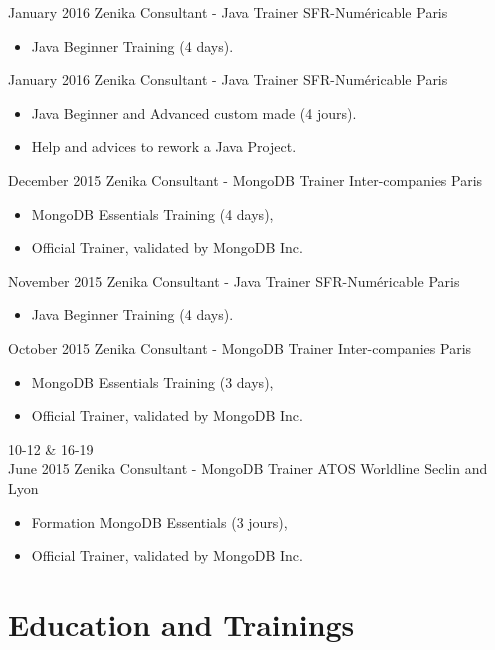 \documentclass[11pt,a4paper]{moderncv}
\begin{document}
\cventry
{January 2016}
{Zenika Consultant - Java Trainer}
{SFR-Numéricable}
{Paris}
{}
{\begin{itemize}
\item Java Beginner Training (4 days).
\end{itemize}
}   %

\cventry
{January 2016}
{Zenika Consultant - Java Trainer}
{SFR-Numéricable}
{Paris}
{}
{\begin{itemize}
\item Java Beginner and Advanced custom made (4 jours).
\item Help and advices to rework a Java Project.
\end{itemize}
}   %

\cventry
{December 2015}
{Zenika Consultant - MongoDB Trainer}
{Inter-companies}
{Paris}
{}
{\begin{itemize}
\item MongoDB Essentials Training (4 days),
\item Official Trainer, validated by MongoDB Inc.
\end{itemize}
}   %

\cventry
{November 2015}
{Zenika Consultant - Java Trainer}
{SFR-Numéricable}
{Paris}
{}
{\begin{itemize}
\item Java Beginner Training (4 days).
\end{itemize}
}   %

\cventry
{October 2015}
{Zenika Consultant - MongoDB Trainer}
{Inter-companies}
{Paris}
{}
{\begin{itemize}
\item MongoDB Essentials Training (3 days),
\item Official Trainer, validated by MongoDB Inc.
\end{itemize}
}   %

\cventry
{10-12 \& 16-19\\ June 2015}
{Zenika Consultant - MongoDB Trainer}
{ATOS Worldline}
{Seclin and Lyon}
{}
{\begin{itemize}
\item Formation MongoDB Essentials (3 jours),
\item Official Trainer, validated by MongoDB Inc.
\end{itemize}
}   %

\section{Education and Trainings}
\end{document}
